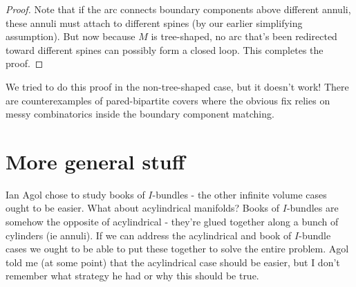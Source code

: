 \documentclass[12pt]{amsart}
\theoremstyle{definition}
\begin{document}
\begin{proof}
Note that if the arc connects boundary components above different annuli, these
annuli must attach to different spines (by our earlier simplifying assumption).
But now because $M$ is tree-shaped, no arc that's been redirected toward
different spines can possibly form a closed loop. This completes the proof.

\end{proof}

We tried to do this proof in the non-tree-shaped case, but it doesn't work!
There are counterexamples of pared-bipartite covers where the obvious fix
relies on messy combinatorics inside the boundary component matching.

\section{More general stuff}

Ian Agol chose to study books of $I$-bundles - the other infinite volume cases
ought to be easier. What about acylindrical manifolds? Books of $I$-bundles are
somehow the opposite of acylindrical - they're glued together along a bunch of
cylinders (ie annuli). If we can address the acylindrical and book of
$I$-bundle cases we ought to be able to put these together to solve the entire
problem.  Agol told me (at some point) that the acylindrical case should be
easier, but I don't remember what strategy he had or why this should be true.




\end{document}
